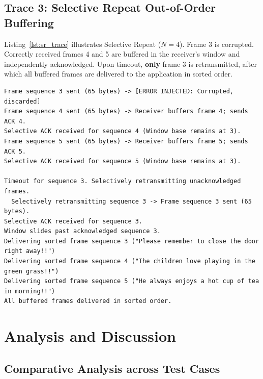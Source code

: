 \documentclass[11pt,a4paper]{article}
\begin{document}
\subsection{Trace 3: Selective Repeat Out-of-Order Buffering}

Listing~\ref{lst:sr_trace} illustrates Selective Repeat (\(N=4\)). Frame 3 is corrupted. Correctly received frames 4 and 5 are buffered in the receiver's window and independently acknowledged. Upon timeout, \textbf{only} frame 3 is retransmitted, after which all buffered frames are delivered to the application in sorted order.

\begin{lstlisting}[style=hexstyle, caption={Live socket execution trace: Selective Repeat selective retransmission.}, label={lst:sr_trace}]
Frame sequence 3 sent (65 bytes) -> [ERROR INJECTED: Corrupted, discarded]
Frame sequence 4 sent (65 bytes) -> Receiver buffers frame 4; sends ACK 4.
Selective ACK received for sequence 4 (Window base remains at 3).
Frame sequence 5 sent (65 bytes) -> Receiver buffers frame 5; sends ACK 5.
Selective ACK received for sequence 5 (Window base remains at 3).

Timeout for sequence 3. Selectively retransmitting unacknowledged frames.
  Selectively retransmitting sequence 3 -> Frame sequence 3 sent (65 bytes).
Selective ACK received for sequence 3.
Window slides past acknowledged sequence 3.
Delivering sorted frame sequence 3 ("Please remember to close the door right away!!")
Delivering sorted frame sequence 4 ("The children love playing in the green grass!!")
Delivering sorted frame sequence 5 ("He always enjoys a hot cup of tea in morning!!")
All buffered frames delivered in sorted order.
\end{lstlisting}

\section{Analysis and Discussion}

\subsection{Comparative Analysis across Test Cases}
\end{document}
